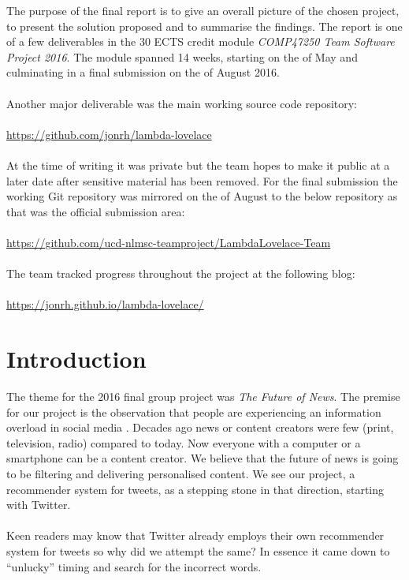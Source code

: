 \documentclass{article}
\begin{document}
The purpose of the final report is to give an overall picture of the chosen project, to present the solution proposed and to summarise the findings. The report is one of a few deliverables in the 30 ECTS credit module \textit{COMP47250 Team Software Project 2016}. The module spanned 14 weeks, starting on the  of May and culminating in a final submission on the  of August 2016.
\\\\
Another major deliverable was the main working source code repository:
\\\\
\url{https://github.com/jonrh/lambda-lovelace}
\\\\
At the time of writing it was private but the team hopes to make it public at a later date after sensitive material has been removed. For the final submission the working Git repository was mirrored on the  of August to the below repository as that was the official submission area:
\\\\
\url{https://github.com/ucd-nlmsc-teamproject/LambdaLovelace-Team}
\\\\
The team tracked progress throughout the project at the following blog:
\\\\
\url{https://jonrh.github.io/lambda-lovelace/}


\clearpage





\tableofcontents
\clearpage













\section{Introduction} 
The theme for the 2016 final group project was \textit{The Future of News}. The premise for our project is the observation that people are experiencing an information overload in social media \cite{information_overload}. Decades ago news or content creators were few (print, television, radio) compared to today. Now everyone with a computer or a smartphone can be a content creator. We believe that the future of news is going to be filtering and delivering personalised content. We see our project, a recommender system for tweets, as a stepping stone in that direction, starting with Twitter.
\\\\
Keen readers may know that Twitter already employs their own recommender system for tweets so why did we attempt the same? In essence it came down to ``unlucky'' timing and search for the incorrect words. 
\end{document}

